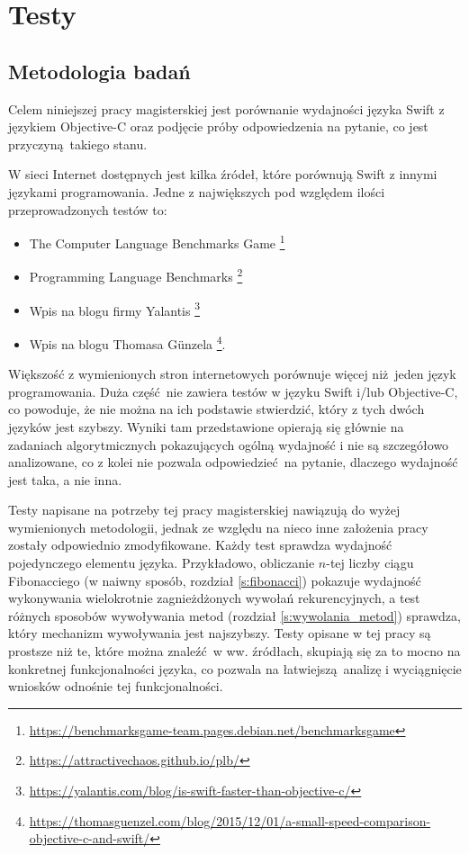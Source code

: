 \documentclass[mgr, shortabstract]{iithesis}
\begin{document}
\chapter{Testy}
\label{ch:testy}

\section{Metodologia badań}

Celem niniejszej pracy magisterskiej jest porównanie wydajności języka Swift z językiem Objective-C oraz podjęcie próby odpowiedzenia na pytanie, co jest przyczyną takiego stanu.

W sieci Internet dostępnych jest kilka źródeł, które porównują Swift z innymi językami programowania. Jedne z największych pod względem ilości przeprowadzonych testów to:
\begin{itemize}
    \item The Computer Language Benchmarks Game \footnote{\url{https://benchmarksgame-team.pages.debian.net/benchmarksgame}}
    \item Programming Language Benchmarks \footnote{\url{https://attractivechaos.github.io/plb/}}
    \item Wpis na blogu firmy Yalantis \footnote{\url{https://yalantis.com/blog/is-swift-faster-than-objective-c/}}
    \item Wpis na blogu Thomasa Günzela \footnote{\url{https://thomasguenzel.com/blog/2015/12/01/a-small-speed-comparison-objective-c-and-swift/}}.
\end{itemize}

Większość z wymienionych stron internetowych porównuje więcej niż jeden język programowania. Duża część nie zawiera testów w języku Swift i/lub Objective-C, co powoduje, że nie można na ich podstawie stwierdzić, który z tych dwóch języków jest szybszy. Wyniki tam przedstawione opierają się głównie na zadaniach algorytmicznych pokazujących ogólną wydajność i nie są szczegółowo analizowane, co z kolei nie pozwala odpowiedzieć na pytanie, dlaczego wydajność jest taka, a nie inna. 

Testy napisane na potrzeby tej pracy magisterskiej nawiązują do wyżej wymienionych metodologii, jednak ze względu na nieco inne założenia pracy zostały odpowiednio zmodyfikowane. Każdy test sprawdza wydajność pojedynczego elementu języka. Przykładowo, obliczanie $n$-tej liczby ciągu Fibonacciego (w naiwny sposób, rozdział \ref{s:fibonacci}) pokazuje wydajność wykonywania wielokrotnie zagnieżdżonych wywołań rekurencyjnych, a test różnych sposobów wywoływania metod (rozdział \ref{s:wywolania_metod}) sprawdza, który mechanizm wywoływania jest najszybszy. Testy opisane w tej pracy są prostsze niż te, które można znaleźć w ww. źródłach, skupiają się za to mocno na konkretnej funkcjonalności języka, co pozwala na łatwiejszą analizę i wyciągnięcie wniosków odnośnie tej funkcjonalności.
\end{document}
